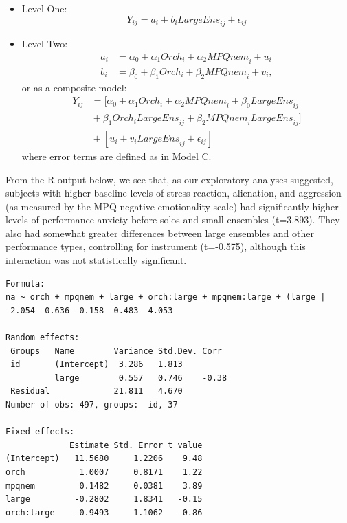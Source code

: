 \documentclass[
]{krantz}
\begin{document}
\begin{itemize}
\item
  Level One:
  \begin{equation}
  Y_{ij} = a_{i}+b_{i}\textstyle{LargeEns}_{ij}+\epsilon_{ij}
  \label{eq:level1modelcnegem}
  \end{equation}
\item
  Level Two:
  \begin{align*}
  a_{i} & = \alpha_{0}+\alpha_{1}\textstyle{Orch}_{i}+\alpha_{2}\textstyle{MPQnem}_{i}+u_{i} \\
  b_{i} & = \beta_{0}+\beta_{1}\textstyle{Orch}_{i}+\beta_{2}\textstyle{MPQnem}_{i}+v_{i},
  \end{align*}
  or as a composite model:
  \begin{align*}
  Y_{ij} & = [\alpha_{0}+\alpha_{1}\textstyle{Orch}_{i}+\alpha_{2}\textstyle{MPQnem}_{i}+\beta_{0}\textstyle{LargeEns}_{ij} \\
   & \textrm{} + \beta_{1}\textstyle{Orch}_{i}\textstyle{LargeEns}_{ij}+\beta_{2}\textstyle{MPQnem}_{i}\textstyle{LargeEns}_{ij}] \\
   & \textrm{} + [u_{i}+v_{i}\textstyle{LargeEns}_{ij}+\epsilon_{ij}]
  \end{align*}
  where error terms are defined as in Model C.
\end{itemize}

From the R output below, we see that, as our exploratory analyses suggested, subjects with higher baseline levels of stress reaction, alienation, and aggression (as measured by the MPQ negative emotionality scale) had significantly higher levels of performance anxiety before solos and small ensembles (t=3.893). They also had somewhat greater differences between large ensembles and other performance types, controlling for instrument (t=-0.575), although this interaction was not statistically significant.

\begin{verbatim}
Formula: 
na ~ orch + mpqnem + large + orch:large + mpqnem:large + (large |  
-2.054 -0.636 -0.158  0.483  4.053 

Random effects:
 Groups   Name        Variance Std.Dev. Corr 
 id       (Intercept)  3.286   1.813         
          large        0.557   0.746    -0.38
 Residual             21.811   4.670         
Number of obs: 497, groups:  id, 37

Fixed effects:
             Estimate Std. Error t value
(Intercept)   11.5680     1.2206    9.48
orch           1.0007     0.8171    1.22
mpqnem         0.1482     0.0381    3.89
large         -0.2802     1.8341   -0.15
orch:large    -0.9493     1.1062   -0.86
\end{verbatim}
\end{document}
